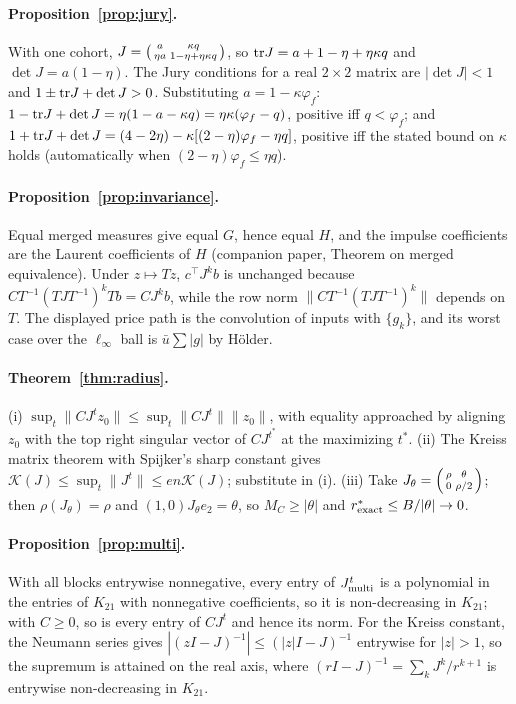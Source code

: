 \documentclass[12pt]{article}
\theoremstyle{definition}
\theoremstyle{remark}
\begin{document}
\paragraph{Proposition~\ref{prop:jury}.} With one cohort, $J=\begin{psmallmatrix}a&\kappa q\\ \eta a&1-\eta+\eta\kappa q\end{psmallmatrix}$, so ${\rm tr}J=a+1-\eta+\eta\kappa q$ and $\det J=a(1-\eta)$. The Jury conditions for a real $2\times2$ matrix are $|\det J|<1$ and $1\pm{\rm tr}J+\det J>0$. Substituting $a=1-\kappa\varphi_f$: $1-{\rm tr}J+\det J=\eta(1-a-\kappa q)=\eta\kappa(\varphi_f-q)$, positive iff $q<\varphi_f$; and $1+{\rm tr}J+\det J=(4-2\eta)-\kappa[(2-\eta)\varphi_f-\eta q]$, positive iff the stated bound on $\kappa$ holds (automatically when $(2-\eta)\varphi_f\le\eta q$).

\paragraph{Proposition~\ref{prop:invariance}.} Equal merged measures give equal $G$, hence equal $H$, and the impulse coefficients are the Laurent coefficients of $H$ (companion paper, Theorem on merged equivalence). Under $z\mapsto Tz$, $c^\top J^kb$ is unchanged because $CT^{-1}(TJT^{-1})^kTb=CJ^kb$, while the row norm $\|CT^{-1}(TJT^{-1})^k\|$ depends on $T$. The displayed price path is the convolution of inputs with $\{g_k\}$, and its worst case over the $\ell_\infty$ ball is $\bar u\sum|g|$ by H\"older.

\paragraph{Theorem~\ref{thm:radius}.} (i) $\sup_t\|CJ^tz_0\|\le\sup_t\|CJ^t\|\|z_0\|$, with equality approached by aligning $z_0$ with the top right singular vector of $CJ^{t^*}$ at the maximizing $t^*$. (ii) The Kreiss matrix theorem with Spijker's sharp constant gives $\mathcal K(J)\le\sup_t\|J^t\|\le en\mathcal K(J)$; substitute in (i). (iii) Take $J_\theta=\begin{psmallmatrix}\rho&\theta\\0&\rho/2\end{psmallmatrix}$; then $\rho(J_\theta)=\rho$ and $(1,0)J_\theta e_2=\theta$, so $M_C\ge|\theta|$ and $r^*_{\rm exact}\le B/|\theta|\to0$.

\paragraph{Proposition~\ref{prop:multi}.} With all blocks entrywise nonnegative, every entry of $J_{\rm multi}^t$ is a polynomial in the entries of $K_{21}$ with nonnegative coefficients, so it is non-decreasing in $K_{21}$; with $C\ge0$, so is every entry of $CJ^t$ and hence its norm. For the Kreiss constant, the Neumann series gives $|(zI-J)^{-1}|\le(|z|I-J)^{-1}$ entrywise for $|z|>1$, so the supremum is attained on the real axis, where $(rI-J)^{-1}=\sum_kJ^k/r^{k+1}$ is entrywise non-decreasing in $K_{21}$.
\end{document}
